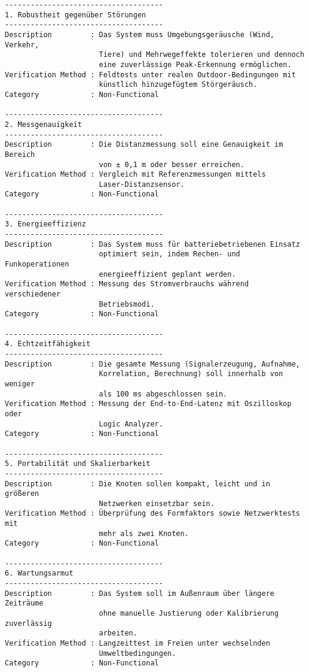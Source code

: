 \begin{verbatim}
-------------------------------------
1. Robustheit gegenüber Störungen
-------------------------------------
Description         : Das System muss Umgebungsgeräusche (Wind, Verkehr, 
                      Tiere) und Mehrwegeffekte tolerieren und dennoch 
                      eine zuverlässige Peak-Erkennung ermöglichen.
Verification Method : Feldtests unter realen Outdoor-Bedingungen mit 
                      künstlich hinzugefügtem Störgeräusch.
Category            : Non-Functional

-------------------------------------
2. Messgenauigkeit
-------------------------------------
Description         : Die Distanzmessung soll eine Genauigkeit im Bereich 
                      von ± 0,1 m oder besser erreichen.
Verification Method : Vergleich mit Referenzmessungen mittels 
                      Laser-Distanzsensor.
Category            : Non-Functional

-------------------------------------
3. Energieeffizienz
-------------------------------------
Description         : Das System muss für batteriebetriebenen Einsatz 
                      optimiert sein, indem Rechen- und Funkoperationen 
                      energieeffizient geplant werden.
Verification Method : Messung des Stromverbrauchs während verschiedener 
                      Betriebsmodi.
Category            : Non-Functional

-------------------------------------
4. Echtzeitfähigkeit
-------------------------------------
Description         : Die gesamte Messung (Signalerzeugung, Aufnahme, 
                      Korrelation, Berechnung) soll innerhalb von weniger 
                      als 100 ms abgeschlossen sein.
Verification Method : Messung der End-to-End-Latenz mit Oszilloskop oder 
                      Logic Analyzer.
Category            : Non-Functional

-------------------------------------
5. Portabilität und Skalierbarkeit
-------------------------------------
Description         : Die Knoten sollen kompakt, leicht und in größeren 
                      Netzwerken einsetzbar sein.
Verification Method : Überprüfung des Formfaktors sowie Netzwerktests mit 
                      mehr als zwei Knoten.
Category            : Non-Functional

-------------------------------------
6. Wartungsarmut
-------------------------------------
Description         : Das System soll im Außenraum über längere Zeiträume 
                      ohne manuelle Justierung oder Kalibrierung zuverlässig 
                      arbeiten.
Verification Method : Langzeittest im Freien unter wechselnden 
                      Umweltbedingungen.
Category            : Non-Functional
\end{verbatim}



